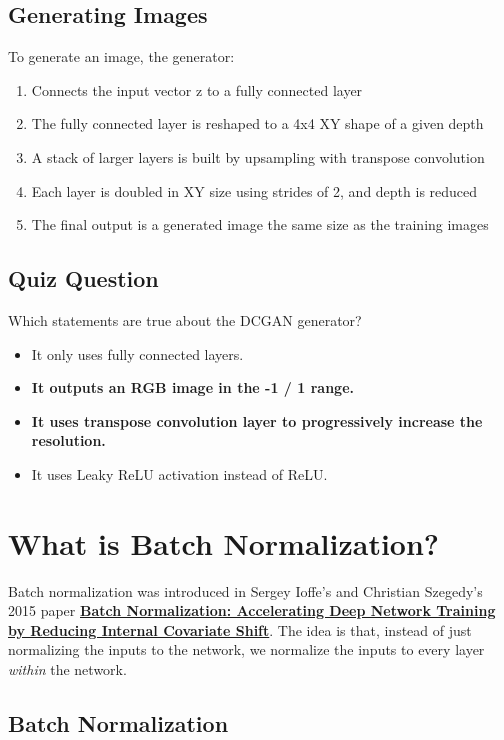 \subsection{Generating Images}

To generate an image, the generator:

\begin{enumerate}
    \item Connects the input vector z to a fully connected layer
    \item The fully connected layer is reshaped to a 4x4 XY shape of a given depth
    \item A stack of larger layers is built by upsampling with transpose convolution
    \item Each layer is doubled in XY size using strides of 2, and depth is reduced
    \item The final output is a generated image the same size as the training images
\end{enumerate}

\subsection{Quiz Question}

Which statements are true about the DCGAN generator?
\begin{itemize}
    \item It only uses fully connected layers.
    \item \textbf{It outputs an RGB image in the -1 / 1 range.}
    \item \textbf{It uses transpose convolution layer to progressively increase the resolution.}
    \item It uses Leaky ReLU activation instead of ReLU.
\end{itemize}

\section{What is Batch Normalization?}
Batch normalization was introduced in Sergey Ioffe's and Christian Szegedy's 2015 paper \href{https://arxiv.org/pdf/1502.03167.pdf}{\textbf{Batch Normalization: Accelerating Deep Network Training by Reducing Internal Covariate Shift}}. The idea is that, instead of just normalizing the inputs to the network, we normalize the inputs to every layer \textit{within} the network.

\subsection{Batch Normalization}


